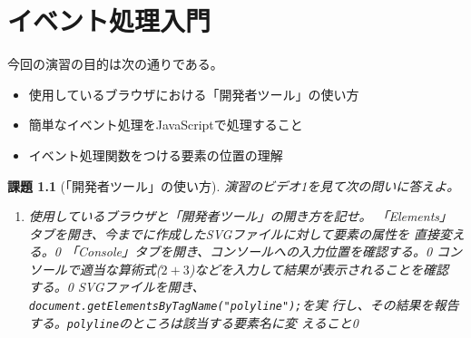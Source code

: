 \documentclass[a4j]{jreport}
\newtheorem{Report}{課題}
\newcommand{\Probs}[3]{%
 \begin{Report}[#1]\upshape
  #2
  \begin{enumerate}\upshape
  \ShowProbs#3\relax\relax
  \end{enumerate}
 \end{Report}
 }
\newcommand{\ShowProbs}[2]{\ifx#1\relax\else%
 \item #1\vspace{#2\textheight}\expandafter\ShowProbs\fi}
\newcommand{\changePage}[1]{
 \renewcommand{\thepage}{第\thechapter 回(#1)-\arabic{page}}
  \setcounter{page}{1}
}
\begin{document}
\chapter{イベント処理入門}
\changePage{5/16}
今回の演習の目的は次の通りである。
\begin{itemize}
 \item 使用しているブラウザにおける「開発者ツール」の使い方
 \item 簡単なイベント処理をJavaScriptで処理すること
 \item イベント処理関数をつける要素の位置の理解
\end{itemize}
\Probs{「開発者ツール」の使い方}{演習のビデオ1を見て次の問いに答えよ。}{
{使用しているブラウザと「開発者ツール」の開き方を記せ。}{0.05}
{「Elements」タブを開き、今までに作成したSVGファイルに対して要素の属性を
直接変える。}{0}
{「Console」タブを開き、コンソールへの入力位置を確認する。}{0}
{コンソールで適当な算術式($2+3$)などを入力して結果が表示されることを確認
する。}{0}
{SVGファイルを開き、
\newline\texttt{document.getElementsByTagName("polyline");}\newline を実
行し、その結果を報告する。\texttt{polyline}のところは該当する要素名に変
えること}{0}
}
\end{document}
